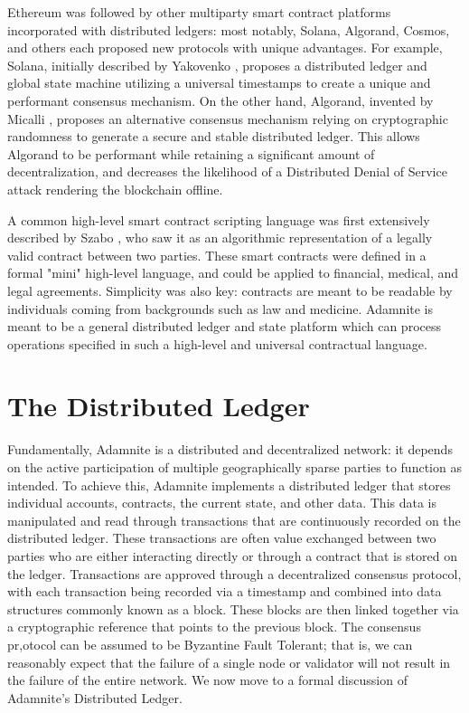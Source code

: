 \documentclass[conference]{IEEEtran}
\begin{document}
Ethereum was followed by other multiparty smart contract platforms incorporated with distributed ledgers: most notably, Solana, Algorand, Cosmos, and others each proposed new protocols with unique advantages. For example, Solana, initially described by Yakovenko \cite {Yakovenko}, proposes a distributed ledger and global state machine utilizing a universal timestamps to create a unique and performant consensus mechanism. On the other hand, Algorand, invented by
Micalli \cite{micalli2017Algroand}, proposes an alternative consensus mechanism relying on cryptographic randomness to generate a secure and stable distributed ledger. This allows Algorand to be performant while retaining a significant amount of decentralization, and decreases the likelihood of a Distributed Denial of Service attack rendering the blockchain offline.

A common high-level smart contract scripting language was first extensively described by Szabo \cite{szaboContract}, who saw it as an algorithmic representation of a legally valid contract between two parties. These smart contracts were defined in a formal "mini" high-level language, and could be applied to financial, medical, and legal agreements. Simplicity was also key: contracts are meant to be readable by individuals coming from backgrounds such as law and medicine. Adamnite is meant to be a general distributed ledger and state platform which can process operations specified in such a high-level and universal contractual language.


\section{The Distributed Ledger}
Fundamentally, Adamnite is a distributed and decentralized network: it depends on the active participation of multiple geographically sparse parties to function as intended. To achieve this, Adamnite implements a distributed ledger that stores individual accounts, contracts, the current state, and other data. This data is manipulated and read through transactions that are continuously recorded on the distributed ledger. These transactions are often value exchanged between two parties who are either interacting directly or through a contract that is stored on the ledger. Transactions are approved through a decentralized consensus protocol, with each transaction being recorded via a timestamp and combined into data structures commonly known as a block. These blocks are then linked together via a cryptographic reference that points to the previous block.  The consensus pr,otocol can be assumed to be Byzantine Fault Tolerant; that is, we can reasonably expect that the failure of a single node or validator will not result in the failure of the entire network. We now move to a formal discussion of Adamnite's Distributed Ledger.
\end{document}
